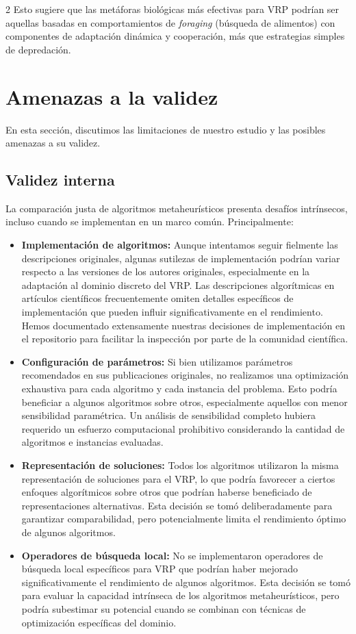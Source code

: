 \documentclass[10pt,a4paper]{extarticle}
\begin{document}
\begin{multicols}{2}
Esto sugiere que las metáforas biológicas más efectivas para VRP podrían ser aquellas basadas en comportamientos de \textit{foraging} (búsqueda de alimentos) con componentes de adaptación dinámica y cooperación, más que estrategias simples de depredación.

\section{Amenazas a la validez}
En esta sección, discutimos las limitaciones de nuestro estudio y las posibles amenazas a su validez.

\subsection{Validez interna}
La comparación justa de algoritmos metaheurísticos presenta desafíos intrínsecos, incluso cuando se implementan en un marco común. Principalmente:
\begin{itemize}
\item \textbf{Implementación de algoritmos:} Aunque intentamos seguir fielmente las descripciones originales, algunas sutilezas de implementación podrían variar respecto a las versiones de los autores originales, especialmente en la adaptación al dominio discreto del VRP. Las descripciones algorítmicas en artículos científicos frecuentemente omiten detalles específicos de implementación que pueden influir significativamente en el rendimiento. Hemos documentado extensamente nuestras decisiones de implementación en el repositorio para facilitar la inspección por parte de la comunidad científica.
\item \textbf{Configuración de parámetros:} Si bien utilizamos parámetros recomendados en sus publicaciones originales, no realizamos una optimización exhaustiva para cada algoritmo y cada instancia del problema. Esto podría beneficiar a algunos algoritmos sobre otros, especialmente aquellos con menor sensibilidad paramétrica. Un análisis de sensibilidad completo hubiera requerido un esfuerzo computacional prohibitivo considerando la cantidad de algoritmos e instancias evaluadas.
\item \textbf{Representación de soluciones:} Todos los algoritmos utilizaron la misma representación de soluciones para el VRP, lo que podría favorecer a ciertos enfoques algorítmicos sobre otros que podrían haberse beneficiado de representaciones alternativas. Esta decisión se tomó deliberadamente para garantizar comparabilidad, pero potencialmente limita el rendimiento óptimo de algunos algoritmos.
\item \textbf{Operadores de búsqueda local:} No se implementaron operadores de búsqueda local específicos para VRP que podrían haber mejorado significativamente el rendimiento de algunos algoritmos. Esta decisión se tomó para evaluar la capacidad intrínseca de los algoritmos metaheurísticos, pero podría subestimar su potencial cuando se combinan con técnicas de optimización específicas del dominio.
\end{itemize}


\end{multicols}
\end{document}
